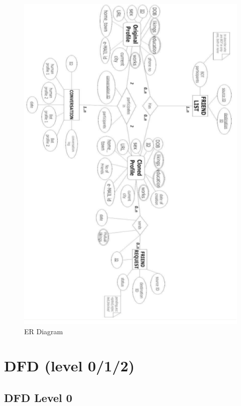 \begin{figure}[H]
\centering
\includegraphics[scale=1.0, angle=180]{project/diagrams/er1}
\caption{ER Diagram}
\label{fig:er}
\end{figure}



\section{DFD (level 0/1/2)}

\subsection{DFD Level 0}

